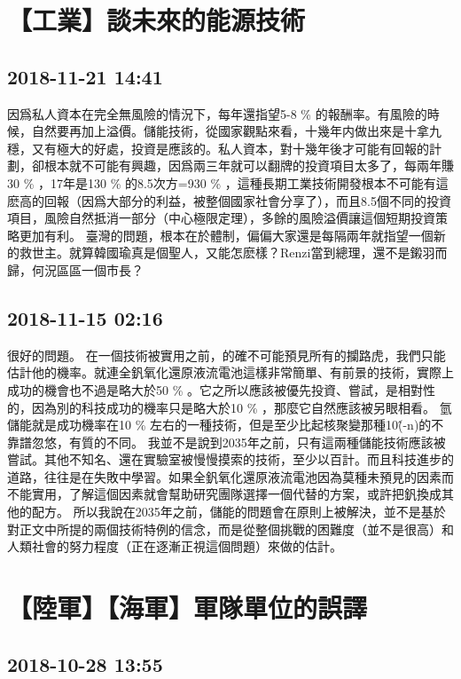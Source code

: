 \documentclass[twocolumn]{ctexart}
\begin{document}
\section*{【工業】談未來的能源技術}
\subsection*{2018-11-21 14:41}

因爲私人資本在完全無風險的情況下，每年還指望5-8 \% 的報酬率。有風險的時候，自然要再加上溢價。儲能技術，從國家觀點來看，十幾年内做出來是十拿九穩，又有極大的好處，投資是應該的。私人資本，對十幾年後才可能有回報的計劃，卻根本就不可能有興趣，因爲兩三年就可以翻牌的投資項目太多了，每兩年賺30 \% ，17年是130 \% 的8.5次方=930 \% ，這種長期工業技術開發根本不可能有這麽高的回報（因爲大部分的利益，被整個國家社會分享了），而且8.5個不同的投資項目，風險自然抵消一部分（中心極限定理），多餘的風險溢價讓這個短期投資策略更加有利。
臺灣的問題，根本在於體制，偏偏大家還是每隔兩年就指望一個新的救世主。就算韓國瑜真是個聖人，又能怎麽樣？Renzi當到總理，還不是鎩羽而歸，何況區區一個市長？
\subsection*{2018-11-15 02:16}

很好的問題。 
在一個技術被實用之前，的確不可能預見所有的攔路虎，我們只能估計他的機率。就連全釩氧化還原液流電池這樣非常簡單、有前景的技術，實際上成功的機會也不過是略大於50 \% 。它之所以應該被優先投資、嘗試，是相對性的，因為別的科技成功的機率只是略大於10 \% ，那麼它自然應該被另眼相看。 
氫儲能就是成功機率在10 \% 左右的一種技術，但是至少比起核聚變那種10\^(-n)的不靠譜忽悠，有質的不同。 
我並不是說到2035年之前，只有這兩種儲能技術應該被嘗試。其他不知名、還在實驗室被慢慢摸索的技術，至少以百計。而且科技進步的道路，往往是在失敗中學習。如果全釩氧化還原液流電池因為莫種未預見的因素而不能實用，了解這個因素就會幫助研究團隊選擇一個代替的方案，或許把釩換成其他的配方。 
所以我說在2035年之前，儲能的問題會在原則上被解決，並不是基於對正文中所提的兩個技術特例的信念，而是從整個挑戰的困難度（並不是很高）和人類社會的努力程度（正在逐漸正視這個問題）來做的估計。
\section*{【陸軍】【海軍】軍隊單位的誤譯}
\subsection*{2018-10-28 13:55}
\end{document}
